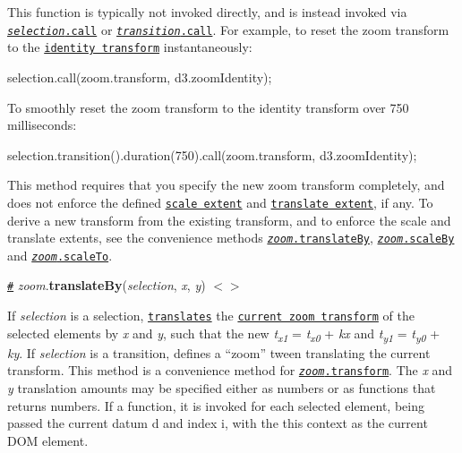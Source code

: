 This function is typically not invoked directly, and is instead invoked via \href{https://github.com/d3/d3-selection#selection_call}{\tt {\itshape selection}.call} or \href{https://github.com/d3/d3-transition#transition_call}{\tt {\itshape transition}.call}. For example, to reset the zoom transform to the \href{#zoomIdentity}{\tt identity transform} instantaneously\+:


\begin{DoxyCode}
selection.call(zoom.transform, d3.zoomIdentity);
\end{DoxyCode}


To smoothly reset the zoom transform to the identity transform over 750 milliseconds\+:


\begin{DoxyCode}
selection.transition().duration(750).call(zoom.transform, d3.zoomIdentity);
\end{DoxyCode}


This method requires that you specify the new zoom transform completely, and does not enforce the defined \href{#zoom_scaleExtent}{\tt scale extent} and \href{#zoom_translateExtent}{\tt translate extent}, if any. To derive a new transform from the existing transform, and to enforce the scale and translate extents, see the convenience methods \href{#zoom_translateBy}{\tt {\itshape zoom}.translate\+By}, \href{#zoom_scaleBy}{\tt {\itshape zoom}.scale\+By} and \href{#zoom_scaleTo}{\tt {\itshape zoom}.scale\+To}.

\href{#zoom_translateBy}{\tt \#} {\itshape zoom}.{\bfseries translate\+By}({\itshape selection}, {\itshape x}, {\itshape y}) \href{https://github.com/d3/d3-zoom/blob/master/src/zoom.js#L110}{\tt $<$$>$}

If {\itshape selection} is a selection, \href{#transform_translate}{\tt translates} the \href{#zoomTransform}{\tt current zoom transform} of the selected elements by {\itshape x} and {\itshape y}, such that the new {\itshape t\textsubscript{x1}} = {\itshape t\textsubscript{x0}} + {\itshape kx} and {\itshape t\textsubscript{y1}} = {\itshape t\textsubscript{y0}} + {\itshape ky}. If {\itshape selection} is a transition, defines a “zoom” tween translating the current transform. This method is a convenience method for \href{#zoom_transform}{\tt {\itshape zoom}.transform}. The {\itshape x} and {\itshape y} translation amounts may be specified either as numbers or as functions that returns numbers. If a function, it is invoked for each selected element, being passed the current datum {\ttfamily d} and index {\ttfamily i}, with the {\ttfamily this} context as the current D\+OM element.


